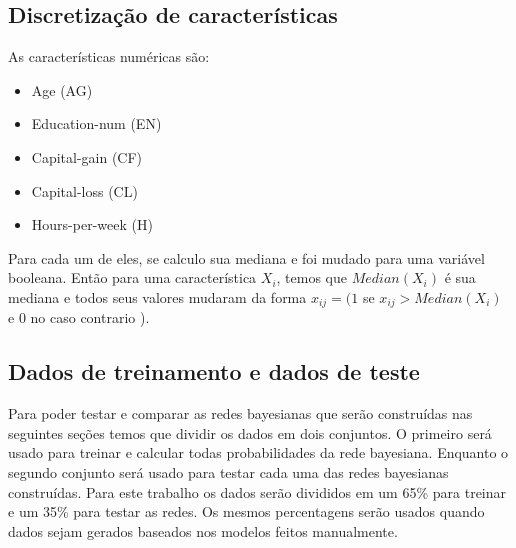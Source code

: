 \subsection{Discretização de características}
\label{subsec:discret}
	As características numéricas são:
	\begin{itemize}
		\item Age (AG)
		\item Education-num (EN)
		\item Capital-gain (CF)
		\item Capital-loss (CL)
		\item Hours-per-week (H)
	\end{itemize}
	Para cada um de eles, se calculo sua mediana e foi mudado para uma variável booleana. Então para uma característica $X_i$, temos que ${Median}( X_i )$ é sua mediana e todos seus valores mudaram da forma $x_{ij} = ( 1$ se $x_{ij} > {Median}( X_i )$ e $0$ no caso contrario ).
	
\subsection{Dados de treinamento e dados de teste}
\label{subsec:dadosprop}
	Para poder testar e comparar as redes bayesianas que serão construídas nas seguintes seções temos que dividir os dados em dois conjuntos. O primeiro será usado para treinar e calcular todas probabilidades da rede bayesiana. Enquanto o segundo conjunto será usado para testar cada uma das redes bayesianas construídas. Para este trabalho os dados serão divididos em um 65\% para treinar e um 35\% para testar as redes. Os mesmos percentagens serão usados quando dados sejam gerados baseados nos modelos feitos manualmente.

\clearpage
